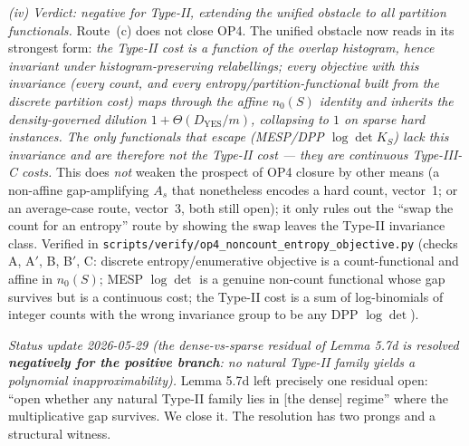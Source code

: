 \documentclass[
]{article}
\begin{document}
\emph{(iv) Verdict: negative for Type-II, extending the unified obstacle to
all partition functionals.} Route~(c) does not close OP4. The unified
obstacle now reads in its strongest form: \emph{the Type-II cost is a
function of the overlap histogram, hence invariant under
histogram-preserving relabellings; every objective with this invariance
(every count, and every entropy/partition-functional built from the
discrete partition cost) maps through the affine $n_0(S)$ identity and
inherits the density-governed dilution $1+\Theta(D_{\mathrm{YES}}/m)$,
collapsing to $1$ on sparse hard instances. The only functionals that
escape (MESP/DPP $\log\det K_S$) lack this invariance and are therefore not
the Type-II cost --- they are continuous Type-III-C costs.} This does
\emph{not} weaken the prospect of OP4 closure by other means (a non-affine
gap-amplifying $A_s$ that nonetheless encodes a hard count, vector~1; or an
average-case route, vector~3, both still open); it only rules out the
``swap the count for an entropy'' route by showing the swap leaves the
Type-II invariance class. Verified in
\texttt{scripts/verify/op4\_noncount\_entropy\_objective.py} (checks A, A$'$,
B, B$'$, C: discrete entropy/enumerative objective is a count-functional and
affine in $n_0(S)$; MESP $\log\det$ is a genuine non-count functional whose
gap survives but is a continuous cost; the Type-II cost is a sum of
log-binomials of integer counts with the wrong invariance group to be any
DPP $\log\det$).

\emph{Status update 2026-05-29 (the dense-vs-sparse residual of
Lemma 5.7d is resolved \textbf{negatively for the positive branch}: no
natural Type-II family yields a polynomial inapproximability).} Lemma 5.7d
left precisely one residual open: ``open whether any natural Type-II family
lies in [the dense] regime'' where the multiplicative gap survives. We close
it. The resolution has two prongs and a structural witness.
\end{document}
